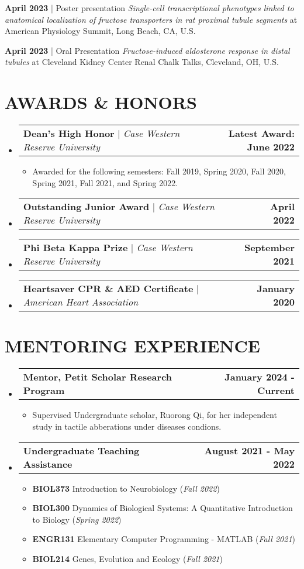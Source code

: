 \documentclass[letterpaper,11pt]{article}
\makeatletter
\newcommand{\resumeItem}[1]{
	\item\small{
		{#1 \vspace{0pt}}
	}
}
\newcommand{\resumeProjectHeading}[2]{
	\item
	\begin{tabular*}{1.001\textwidth}{l@{\extracolsep{\fill}}r}
		\small#1 & \textbf{\small #2}\\
	\end{tabular*}\vspace{-4pt}
}
\newcommand{\resumeSubHeadingListStart}{\begin{itemize}[leftmargin=0.0in, label={}]}
\newcommand{\resumeSubHeadingListEnd}{\end{itemize}}
\newcommand{\resumeItemListStart}{\begin{itemize}}
\newcommand{\resumeItemListEnd}{\end{itemize}\vspace{-5pt}}
\makeatother
\begin{document}
	\textbf{April 2023} | Poster presentation {\textit{Single-cell transcriptional phenotypes linked to anatomical localization of fructose transporters in rat proximal tubule segments}}  at American Physiology Summit, Long Beach, CA, U.S.

	\textbf{April 2023} | Oral Presentation {\textit{Fructose-induced aldosterone response in distal tubules}} at Cleveland Kidney Center Renal Chalk Talks, Cleveland, OH, U.S. 
	
	\section{AWARDS \& HONORS}
	\vspace{-5pt}
	\resumeSubHeadingListStart
	
	\resumeProjectHeading
	{\textbf{Dean's High Honor} $|$ \emph{Case Western Reserve University}}{Latest Award: June 2022}
	\resumeItemListStart
	\resumeItem{Awarded for the following semesters: Fall 2019, Spring 2020, Fall 2020, Spring 2021, Fall 2021, and Spring 2022.}
	\resumeItemListEnd
	\vspace{-20pt}
	
	\resumeProjectHeading
	{\textbf{Outstanding Junior Award} $|$ \emph{Case Western Reserve University}}{April 2022}
	\vspace{-30pt}
	
	\resumeProjectHeading
	{\textbf{Phi Beta Kappa Prize} $|$ \emph{Case Western Reserve University}}{September 2021}
	\vspace{-30pt}
	
	\resumeProjectHeading
	{\textbf{Heartsaver CPR \& AED Certificate} $|$ \emph{American Heart Association}}{January 2020}
	\resumeSubHeadingListEnd
	\vspace{-15pt}

	\section{MENTORING EXPERIENCE}
	\resumeSubHeadingListStart
	\vspace{-5px}
	\resumeProjectHeading{\textbf{Mentor, Petit Scholar Research Program}}{January 2024 - Current}
	\resumeItemListStart
	\resumeItem{Supervised Undergraduate scholar, Ruorong Qi, for her independent study in tactile abberations under diseases condions.}
	\resumeItemListEnd
	\vspace{-30px}

	\resumeProjectHeading{\textbf{Undergraduate Teaching Assistance}}{August 2021 - May 2022}
	\resumeItemListStart
	\resumeItem{\textbf{BIOL373} {Introduction to Neurobiology} (\textit{Fall 2022})}
	\resumeItem{\textbf{BIOL300} {Dynamics of Biological Systems: A Quantitative Introduction to Biology} (\textit{Spring 2022})}
	\resumeItem{\textbf{ENGR131} {Elementary Computer Programming - MATLAB} (\textit{Fall 2021})}
	\resumeItem{\textbf{BIOL214} {Genes, Evolution and Ecology} (\textit{Fall 2021})}
	\resumeItemListEnd
	\vspace{-5px}
	\resumeSubHeadingListEnd 
	
\end{document}
